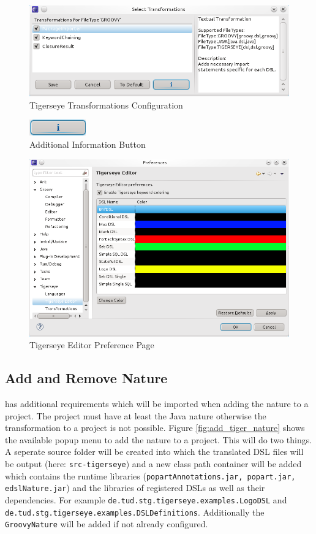 	\begin{figure}
	  \centering
	  \includegraphics[width=.5\textwidth,keepaspectratio=true]{./pics/preferences_transformations_selected.png}
	  \caption{Tigerseye Transformations Configuration}
	  \label{fig:prefs_transformations_selected}
	\end{figure}

	\begin{figure}
	  \centering
	  \includegraphics{./pics/additional_information_button.png}
	  \caption{Additional Information Button}
	  \label{fig:additional_information_button}
	\end{figure}

	\begin{figure}
	  \centering
	  \includegraphics[width=.5\textwidth,keepaspectratio=true]{./pics/preferences_editor.png}
	  \caption{Tigerseye Editor Preference Page}
	  \label{fig:prefs_editor}
	\end{figure}

	\subsection{Add and Remove \tiger Nature}
	  \tiger has additional requirements which will be imported when adding the \tiger nature to a project. The project must have at least the Java nature otherwise the transformation to a \tiger project is not possible. Figure \ref{fig:add_tiger_nature} shows the available popup menu to add the \tiger nature to a project. This will do two things. A seperate source folder will be created into which the translated DSL files will be output (here: \texttt{src-tigerseye}) and a new class path container will be added which contains the runtime libraries (\texttt{popartAnnotations.jar, popart.jar, edslNature.jar}) and the libraries of registered DSLs as well as their dependencies. For example \texttt{de.tud.stg.tigerseye.examples.LogoDSL} and \texttt{de.tud.stg.tigerseye.examples.DSLDefinitions}. Additionally the \texttt{GroovyNature} will be added if not already configured.
	
